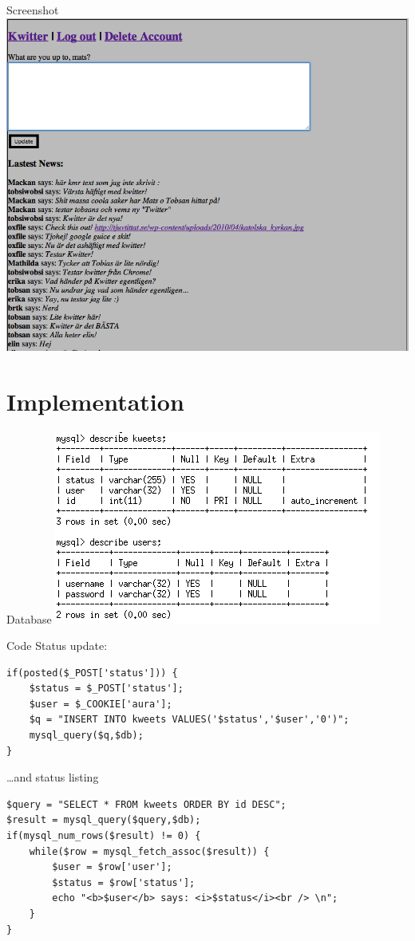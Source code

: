 \documentclass{beamer}
\begin{document}
\begin{frame}{Screenshot}
    \includegraphics[width=\textwidth]{main.png}
\end{frame}

\section{Implementation}

\begin{frame}{Database}
    \includegraphics[width=\textwidth]{database.png}
\end{frame}

\begin{frame}[fragile]{Code}
Status update:
\begin{lstlisting} 
if(posted($_POST['status'])) {
    $status = $_POST['status'];
    $user = $_COOKIE['aura'];
    $q = "INSERT INTO kweets VALUES('$status','$user','0')";
    mysql_query($q,$db);
}
\end{lstlisting}
\ldots and status listing
\begin{lstlisting}
$query = "SELECT * FROM kweets ORDER BY id DESC";
$result = mysql_query($query,$db);
if(mysql_num_rows($result) != 0) {
    while($row = mysql_fetch_assoc($result)) {
        $user = $row['user'];
        $status = $row['status'];
        echo "<b>$user</b> says: <i>$status</i><br /> \n";
    }
}
\end{lstlisting}
\end{frame}
\end{document}

